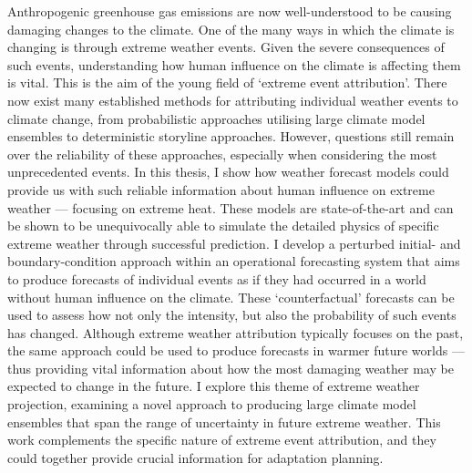 Anthropogenic greenhouse gas emissions are now well-understood to be causing damaging changes to the climate. One of the many ways in which the climate is changing is through extreme weather events. Given the severe consequences of such events, understanding how human influence on the climate is affecting them is vital. This is the aim of the young field of `extreme event attribution'. There now exist many established methods for attributing individual weather events to climate change, from probabilistic approaches utilising large climate model ensembles to deterministic storyline approaches. However, questions still remain over the reliability of these approaches, especially when considering the most unprecedented events. In this thesis, I show how weather forecast models could provide us with such reliable information about human influence on extreme weather --- focusing on extreme heat. These models are state-of-the-art and can be shown to be unequivocally able to simulate the detailed physics of specific extreme weather through successful prediction. I develop a perturbed initial- and boundary-condition approach within an operational forecasting system that aims to produce forecasts of individual events as if they had occurred in a world without human influence on the climate. These `counterfactual' forecasts can be used to assess how not only the intensity, but also the probability of such events has changed. Although extreme weather attribution typically focuses on the past, the same approach could be used to produce forecasts in warmer future worlds --- thus providing vital information about how the most damaging weather may be expected to change in the future. I explore this theme of extreme weather projection, examining a novel approach to producing large climate model ensembles that span the range of uncertainty in future extreme weather. This work complements the specific nature of extreme event attribution, and they could together provide crucial information for adaptation planning. 